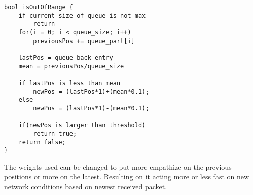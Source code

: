 \noindent
\begin{minipage}[t]{0.95\linewidth}
\begin{lstlisting}[caption=Out of range function in base station., label={lst:basestation2}]
bool isOutOfRange {
	if current size of queue is not max
		return
	for(i = 0; i < queue_size; i++)
		previousPos += queue_part[i]
		
	lastPos = queue_back_entry
	mean = previousPos/queue_size
	
	if lastPos is less than mean
		newPos = (lastPos*1)+(mean*0.1);
	else
		newPos = (lastPos*1)-(mean*0.1);
	
	if(newPos is larger than threshold)
		return true;
	return false;
}
\end{lstlisting}
\end{minipage}

\noindent The weights used can be changed to put more empathize on the previous positions or more on the latest. Resulting on it acting more or less fast on new network conditions based on newest received packet.